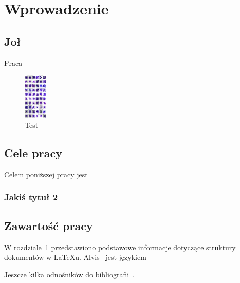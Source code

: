 \chapter{Wprowadzenie}
\label{cha:wprowadzenie}

\section{Joł}

Praca

\begin{figure}[h]
    \centering
    \includegraphics[width=0.1\textwidth]{images_examples}
    \caption{Test}
\end{figure}


\section{Cele pracy}
\label{sec:celePracy}

Celem poniższej pracy jest

\subsection{Jakiś tytuł 2}

\section{Zawartość pracy}
\label{sec:zawartoscPracy}

W rozdziale~\ref{cha:wprowadzenie} przedstawiono podstawowe informacje dotyczące struktury dokumentów w \LaTeX u. Alvis~\cite{Alvis2011} jest językiem\textellipsis

Jeszcze kilka odnośników do bibliografii~\cite{Resnetx}.